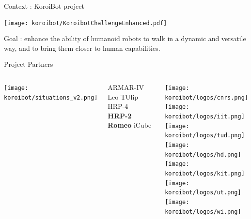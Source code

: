 \begin{frame}{Context : KoroiBot project}
\begin{center}
  \texttt{[image: koroibot/KoroibotChallengeEnhanced.pdf]}
\end{center}

Goal : enhance the ability of humanoid robots to walk in a dynamic and versatile way, and to bring them closer to human capabilities.
\end{frame}


\begin{frame}{Project Partners}
\vspace*{-0.7cm}
\begin{columns}
\begin{center}
  \texttt{[image: koroibot/situations\_v2.png]}
\end{center}
\vspace*{-0.5cm}
  \small{ \hspace*{0.3cm} ARMAR-IV \hspace*{0.4cm}  Leo \hspace*{0.4cm} TUlip \hspace*{0.6cm} HRP-4 }\\
  \small{ \hspace*{1.7cm} \textcolor{blue!50!black}{\textbf{HRP-2}} \hspace*{0.1cm} \textcolor{blue!50!black}{\textbf{Romeo}} \hspace*{0.3cm} iCube}
\begin{center}
  \texttt{[image: koroibot/logos/cnrs.png]}\\
  \texttt{[image: koroibot/logos/iit.png]}\\
  \texttt{[image: koroibot/logos/tud.png]}\\
  \texttt{[image: koroibot/logos/hd.png]}\\
  \texttt{[image: koroibot/logos/kit.png]}\\
  \texttt{[image: koroibot/logos/ut.png]}\\
  \texttt{[image: koroibot/logos/wi.png]}
\end{center}

\end{columns}
\end{frame}

